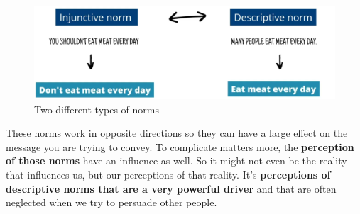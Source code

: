\documentclass[../summary.tex]{subfiles}
\begin{document}
				\begin{figure}[h]
					\centering
					\includegraphics[width=0.7\linewidth]{../images/12-norm.png}
					\caption{Two different types of norms}
					\label{fig:12-norm}
				\end{figure}
				These norms work in opposite directions so they can have a large effect on the message you are trying to convey. To complicate matters more, the \textbf{perception of those norms} have an influence as well. So it might not even be the reality that influences us, but our perceptions of that reality. It's \textbf{perceptions of descriptive norms that are a very powerful driver} and that are often neglected when we try to persuade other people.
				
\end{document}

